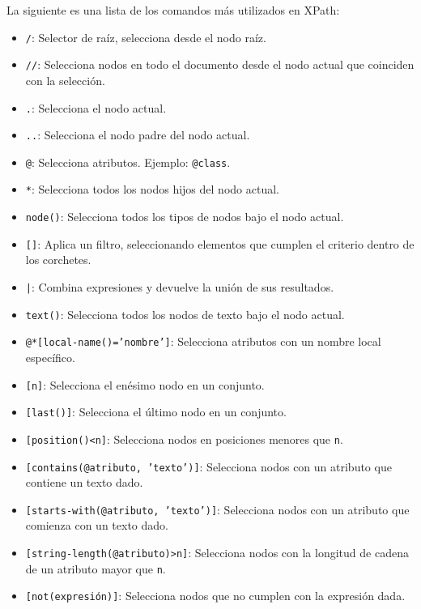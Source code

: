         La siguiente es una lista de los comandos más utilizados en XPath:

        \begin{itemize}
            \item \texttt{/}: Selector de raíz, selecciona desde el nodo raíz.
            \item \texttt{//}: Selecciona nodos en todo el documento desde el nodo actual que coinciden con la selección.
            \item \texttt{.}: Selecciona el nodo actual.
            \item \texttt{..}: Selecciona el nodo padre del nodo actual.
            \item \texttt{@}: Selecciona atributos. Ejemplo: \texttt{@class}.
            \item \texttt{*}: Selecciona todos los nodos hijos del nodo actual.
            \item \texttt{node()}: Selecciona todos los tipos de nodos bajo el nodo actual.
            \item \texttt{[]}: Aplica un filtro, seleccionando elementos que cumplen el criterio dentro de los corchetes.
            \item \texttt{|}: Combina expresiones y devuelve la unión de sus resultados.
            \item \texttt{text()}: Selecciona todos los nodos de texto bajo el nodo actual.
            \item \texttt{@*[local-name()='nombre']}: Selecciona atributos con un nombre local específico.
            \item \texttt{[n]}: Selecciona el enésimo nodo en un conjunto.
            \item \texttt{[last()]}: Selecciona el último nodo en un conjunto.
            \item \texttt{[position()<n]}: Selecciona nodos en posiciones menores que \texttt{n}.
            \item \texttt{[contains(@atributo, 'texto')]}: Selecciona nodos con un atributo que contiene un texto dado.
            \item \texttt{[starts-with(@atributo, 'texto')]}: Selecciona nodos con un atributo que comienza con un texto dado.
            \item \texttt{[string-length(@atributo)>n]}: Selecciona nodos con la longitud de cadena de un atributo mayor que \texttt{n}.
            \item \texttt{[not(expresión)]}: Selecciona nodos que no cumplen con la expresión dada.
        \end{itemize}

        
        